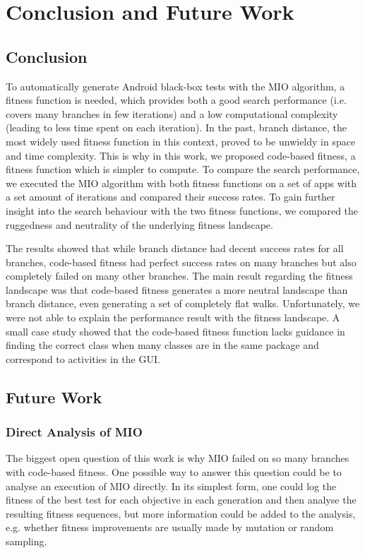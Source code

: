 \documentclass[
  a4paper,  %
  twoside,  %
  bibliography=totoc,
  headsepline,
  cleardoublepage=empty,
  parskip=half,
  draft=false
]{scrbook}
\begin{document}
\chapter{Conclusion and Future Work}

\section{Conclusion}
To automatically generate Android black-box tests with the MIO algorithm, a fitness function is needed, which provides both a good search performance (i.e. covers many branches in few iterations) and a low computational complexity (leading to less time spent on each iteration).
In the past, branch distance, the most widely used fitness function in this context, proved to be unwieldy in space and time complexity.
This is why in this work, we proposed code-based fitness, a fitness function which is simpler to compute.
To compare the search performance, we executed the MIO algorithm with both fitness functions on a set of apps with a set amount of iterations and compared their success rates.
To gain further insight into the search behaviour with the two fitness functions, we compared the ruggedness and neutrality of the underlying fitness landscape.

The results showed that while branch distance had decent success rates for all branches, code-based fitness had perfect success rates on many branches but also completely failed on many other branches.
The main result regarding the fitness landscape was that code-based fitness generates a more neutral landscape than branch distance, even generating a set of completely flat walks. 
Unfortunately, we were not able to explain the performance result with the fitness landscape.
A small case study showed that the code-based fitness function lacks guidance in finding the correct class when many classes are in the same package and correspond to activities in the GUI.

\section{Future Work}

\subsection*{Direct Analysis of MIO}
The biggest open question of this work is why MIO failed on so many branches with code-based fitness.
One possible way to answer this question could be to analyse an execution of MIO directly.
In its simplest form, one could log the fitness of the best test for each objective in each generation and then analyse the resulting fitness sequences, but more information could be added to the analysis, e.g. whether fitness improvements are usually made by mutation or random sampling.
\end{document}
